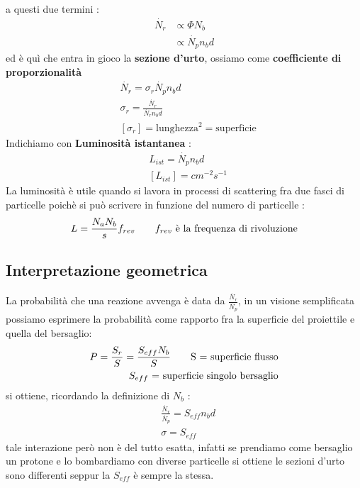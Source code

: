 a questi due termini : 
\begin{align*}
        \dot{N_{r}} &\propto \Phi N_{b} \\
                    &\propto \dot{N_{p}}n_{b}d
\end{align*}
ed è quì che entra in gioco la \textbf{sezione d'urto}, ossiamo come \textbf{coefficiente di  \\ proporzionalità}
\begin{align*}
    &\dot{N_{r}} = \sigma_{r}\dot{N_{p}}n_{b}d \\
    &\sigma_{r} = \frac{\dot{N_{r}}}{\dot{N_{r}}n_{b}d} \\
    &[\sigma_{r}] = \text{lunghezza}^{2} = \text{superficie}
\end{align*}
Indichiamo con \textbf{Luminosità istantanea} : 
\begin{align*}
    &L_{ist} = \dot{N_{p}}n_{b}d \\
    &[L_{ist}] = cm^{-2}s^{-1} 
\end{align*}
La luminosità è utile quando si lavora in processi di scattering fra due fasci di particelle
poichè si può scrivere in funzione del numero di particelle : 
\begin{align*}
    L = \frac{N_{a}N_{b}}{s}f_{rev} \tag*{$f_{rev}$ è la frequenza di rivoluzione}
\end{align*}
\subsection{Interpretazione geometrica}
La probabilità che una reazione avvenga è data da $\frac{\dot{N_{r}}}{\dot{N_{p}}}$, in un 
visione semplificata possiamo esprimere la probabilità come rapporto fra la superficie del 
proiettile e quella del bersaglio:
\begin{align*}
P = \frac{S_{r}}{S} = \frac{S_{eff}N_{b}}{S} \tag*{S = superficie flusso} \\ \tag*{$S_{eff}$ = superficie singolo bersaglio}
\end{align*}
si ottiene, ricordando la definizione di $N_{b}$ : 
\begin{align*}
        &\frac{\dot{N_{r}}}{\dot{N_{p}}} = S_{eff}n_{b}d \\
        &\sigma = S_{eff}
\end{align*}
tale interazione però non è del tutto esatta, infatti se prendiamo come bersaglio un protone 
e lo bombardiamo con diverse particelle si ottiene le sezioni d'urto sono differenti seppur
la $S_{eff}$ è sempre la stessa.
\newpage

